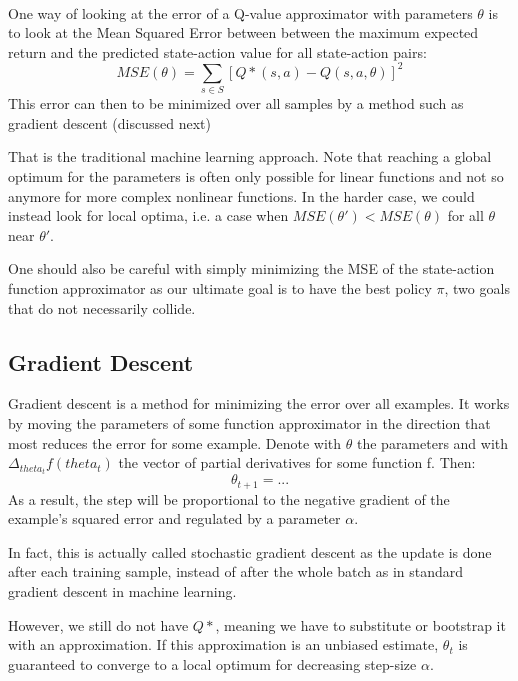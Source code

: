 \paragraph{}
One way of looking at the error of a Q-value approximator
with parameters $\theta$ is to look at the Mean Squared Error
between between the maximum expected return and
the predicted state-action value for all state-action pairs:
$$MSE(\theta) = \sum_{s \in S}[Q*(s,a)-Q(s,a,\theta)]^2$$
This error can then to be minimized over all samples
by a method such as gradient descent (discussed next)

That is the traditional machine learning approach.
Note that reaching a global optimum for the parameters
is often only possible for linear functions
and not so anymore for more complex nonlinear functions.
In the harder case, we could instead look for local optima,
i.e. a case when $MSE(\theta') < MSE(\theta)$
for all $\theta$ near $\theta'$.

One should also be careful with simply minimizing the MSE
of the state-action function approximator
as our ultimate goal is to have the best policy $\pi$,
two goals that do not necessarily collide.

\subsection{Gradient Descent}
Gradient descent is a method for minimizing the error
over all examples.
It works by moving the parameters of some function approximator
in the direction that most reduces the error for some example.
Denote with $\theta$ the parameters
and with $\Delta_{theta_t}f(theta_t)$ the vector of partial derivatives
for some function f.
Then:
$$ \theta_{t+1} = ... $$
As a result, the step will be proportional
to the negative gradient of the example's squared error
and regulated by a parameter $\alpha$.

In fact, this is actually called
stochastic gradient descent
as the update is done after each training sample,
instead of after the whole batch
as in standard gradient descent in machine learning.

However,
we still do not have
$Q*$, meaning we have to substitute
or bootstrap it with an approximation.
If this approximation is an unbiased estimate,
$\theta_t$ is guaranteed to converge
to a local optimum
for decreasing step-size $\alpha$.


